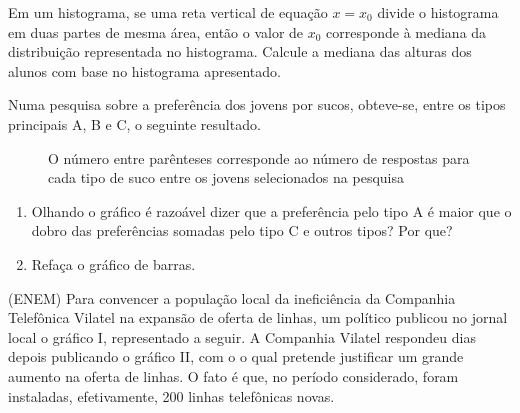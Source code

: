Em um histograma, se uma reta vertical de equação \(x=x_0\) divide o histograma em duas partes de mesma área, então o valor de \(x_0\) corresponde à mediana da distribuição representada no histograma. Calcule a mediana das alturas dos alunos com base no histograma apresentado.

\item Numa pesquisa sobre a preferência dos jovens por sucos, obteve-se, entre os tipos principais A, B e C, o seguinte resultado.

\begin{figure}[H]
\centering
\capstart

\caption{O número entre parênteses corresponde ao número de respostas para cada tipo de suco entre os jovens selecionados na pesquisa}\label{\detokenize{PE103-E:id11}}\label{\detokenize{PE103-E:id28}}\end{figure}
\begin{enumerate}
\item {} 
Olhando o gráfico é razoável dizer que a preferência pelo tipo A é maior que o dobro das preferências somadas pelo tipo C e outros tipos? Por que?

\item {} 
Refaça o gráfico de barras.

\end{enumerate}

\item (ENEM) Para convencer a população local da ineficiência da Companhia Telefônica Vilatel na expansão de oferta de linhas, um político publicou no jornal local o gráfico I, representado a seguir. A Companhia Vilatel respondeu dias depois publicando o gráfico II, com o o qual pretende justificar um grande aumento na oferta de linhas. O fato é que, no período considerado, foram instaladas, efetivamente, 200 linhas telefônicas novas.

